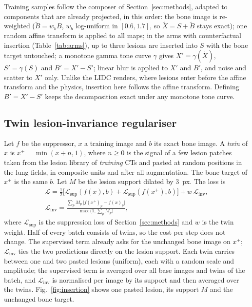 Training samples follow the composer of Section~\ref{sec:methods}, adapted to components that are already projected, in this order: the
bone image is re-weighted ($\tilde B=w_bB$, $w_b$ log-uniform in $[0.6,1.7]$, so $\tilde X=S+\tilde B$ stays exact); one random affine
transform is applied to all maps; in the arms with counterfactual insertion (Table~\ref{tab:arms}), up to three lesions are inserted into $S$
with the bone target untouched; a monotone gamma tone curve $\gamma$ gives $X'=\gamma(\tilde X)$, $S'=\gamma(S)$ and $B'=X'-S'$; linear blur
is applied to $X'$ and $B'$, and noise and scatter to $X'$ only. Unlike the LIDC renders, where lesions enter before the affine transform and
the physics, insertion here follows the affine transform. Defining $B'=X'-S'$ keeps the decomposition exact under any monotone tone curve.

\subsection{Twin lesion-invariance regulariser}
Let $f$ be the suppressor, $x$ a training image and $b$ its exact bone image. A \emph{twin} of $x$ is $x^{+}=\min(x+n,1)$, where $n\ge0$ is the
signal of a few lesion patches taken from the lesion library of \emph{training} CTs and pasted at random positions in the lung fields, in composite
units and after all augmentation. The bone target of $x^{+}$ is the same $b$. Let $M$ be the lesion support dilated by $3$~px. The loss is
\begin{equation}
\begin{gathered}
\mathcal{L}=\tfrac12\big[\mathcal{L}_{\mathrm{sup}}(f(x),b)+\mathcal{L}_{\mathrm{sup}}(f(x^{+}),b)\big]+w\,\mathcal{L}_{\mathrm{inv}},\\
\mathcal{L}_{\mathrm{inv}}=\frac{\sum_p M_p\,\big|f(x^{+})_p-f(x)_p\big|}{\max\big(1,\sum_p M_p\big)},
\end{gathered}
\label{eq:twin}
\end{equation}
where $\mathcal{L}_{\mathrm{sup}}$ is the suppression loss of Section~\ref{sec:methods} and $w$ is the twin weight. Half of every batch consists of twins, so
the cost per step does not change. The supervised term already asks for the unchanged bone image on $x^{+}$; $\mathcal{L}_{\mathrm{inv}}$ ties the
two predictions directly on the lesion support. Each twin carries between one and two pasted lesions (uniform), each with a random scale and
amplitude; the supervised term is averaged over all base images and twins of the batch, and $\mathcal{L}_{\mathrm{inv}}$ is normalised per image by
its support and then averaged over the twins. Fig.~\ref{fig:insertion} shows one pasted lesion, its support $M$ and the unchanged bone target.

